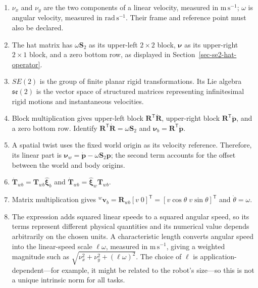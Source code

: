 \documentclass[
  australian,
  12pt,
  letterpaper,
  DIV=11,
  numbers=noendperiod,
  twoside]{scrreprt}
\providecommand{\tightlist}{%
  \setlength{\itemsep}{0pt}\setlength{\parskip}{0pt}}
\begin{document}
\begin{enumerate}
\def\labelenumi{\arabic{enumi}.}
\tightlist
\item
  \(\nu_x\) and \(\nu_y\) are the two components of a linear velocity,
  measured in \(\mathrm{m\,s^{-1}}\); \(\omega\) is angular velocity,
  measured in \(\mathrm{rad\,s^{-1}}\). Their frame and reference point
  must also be declared.
\item
  The hat matrix has \(\omega\mathbf S_2\) as its upper-left
  \(2\times2\) block, \(\boldsymbol\nu\) as its upper-right \(2\times1\)
  block, and a zero bottom row, as displayed in
  Section~\ref{sec-se2-hat-operator}.
\item
  \(SE(2)\) is the group of finite planar rigid transformations. Its Lie
  algebra \(\mathfrak{se}(2)\) is the vector space of structured
  matrices representing infinitesimal rigid motions and instantaneous
  velocities.
\item
  Block multiplication gives upper-left block
  \(\mathbf R^\mathsf T\dot{\mathbf R}\), upper-right block
  \(\mathbf R^\mathsf T\dot{\mathbf p}\), and a zero bottom row.
  Identify \(\mathbf R^\mathsf T\dot{\mathbf R}=\omega\mathbf S_2\) and
  \(\boldsymbol\nu_b=\mathbf R^\mathsf T\dot{\mathbf p}\).
\item
  A spatial twist uses the fixed world origin as its velocity reference.
  Therefore, its linear part is
  \(\boldsymbol\nu_w=\dot{\mathbf p}-\omega\mathbf S_2\mathbf p\); the
  second term accounts for the offset between the world and body
  origins.
\item
  \(\dot{\mathbf T}_{wb}=\mathbf T_{wb}\widehat{\boldsymbol\xi}_b\) and
  \(\dot{\mathbf T}_{wb}=\widehat{\boldsymbol\xi}_w\mathbf T_{wb}\).
\item
  Matrix multiplication gives
  \({}^w\mathbf v_b=\mathbf R_{wb}[v\;0]^\mathsf T=[v\cos\theta\;v\sin\theta]^\mathsf T\)
  and \(\dot\theta=\omega\).
\item
  The expression adds squared linear speeds to a squared angular speed,
  so its terms represent different physical quantities and its numerical
  value depends arbitrarily on the chosen units. A characteristic length
  converts angular speed into the linear-speed scale \(\ell\omega\),
  measured in \(\mathrm{m\,s^{-1}}\), giving a weighted magnitude such
  as \(\sqrt{\nu_x^2+\nu_y^2+(\ell\omega)^2}\). The choice of \(\ell\)
  is application-dependent---for example, it might be related to the
  robot's size---so this is not a unique intrinsic norm for all tasks.
\end{enumerate}
\end{document}

